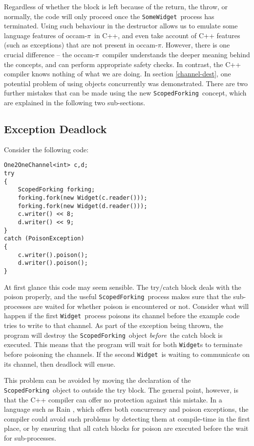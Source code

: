 \documentclass[12pt]{IOS-Book-Article-CPA-2007}
\newcommand{\occampi}{occam-$\pi$}
\newcommand{\code}[1]{{\small\texttt{#1}}}
\begin{document}
Regardless of whether the block is left because of the return, the throw, or normally, the code will only proceed once the \code{SomeWidget}~process 
has terminated.  Using such behaviour in the destructor allows us to emulate some language features of \occampi~in C++, and even take account of C++ 
features (such as exceptions) that are not present in \occampi.  However, there is one crucial difference -- the \occampi~compiler understands the 
deeper meaning behind the concepts, and can perform appropriate safety checks.  In contrast, the C++ compiler knows nothing of what we are doing.  
In section \ref{channel-dest}, one potential problem of using objects concurrently was demonstrated.  There are two further mistakes that can be 
made using the new \code{ScopedForking}~concept, which are explained in the following two sub-sections.

\subsection{Exception Deadlock}

Consider the following code:

{\small\begin{verbatim}
One2OneChannel<int> c,d;
try
{
    ScopedForking forking;
    forking.fork(new Widget(c.reader()));
    forking.fork(new Widget(d.reader()));
    c.writer() << 8;
    d.writer() << 9;
}
catch (PoisonException)
{
    c.writer().poison();
    d.writer().poison();
}
\end{verbatim}}

At first glance this code may seem sensible.  The try/catch block deals with the poison properly, and the useful \code{ScopedForking}~process makes 
sure that the sub-processes are waited for whether poison is encountered or not.  Consider what will happen if the first \code{Widget}~process poisons 
its channel before the example code tries to write to that channel.  As part of the exception being thrown, the program will destroy the 
\code{ScopedForking}~object \textit{before}~the catch block is executed.  This means that the program will wait for both \code{Widget}s to terminate 
before poisoning the channels.  If the second \code{Widget}~is waiting to communicate on its channel, then deadlock will ensue.  

This problem can be avoided by moving the declaration of the \code{ScopedForking}~object to outside the try block.  The general point, however, is 
that the C++ compiler can offer no protection against this mistake.  In a language such as Rain \cite{brown-rain-06}, which offers both concurrency 
and poison exceptions, the compiler could avoid such problems by detecting them at compile-time in the first place, or by ensuring that all catch blocks for 
poison are executed before the wait for sub-processes.
\end{document}
